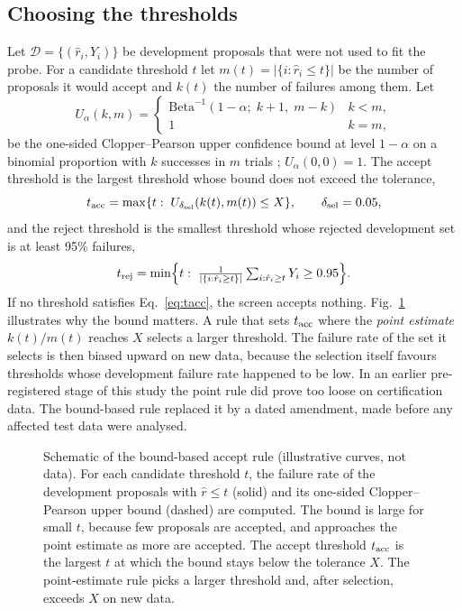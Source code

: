 \subsection{Choosing the thresholds}
Let $\mathcal D=\{(\hat r_i,Y_i)\}$ be development proposals that were not used to fit the probe. For a
candidate threshold $t$ let $m(t)=|\{i:\hat r_i\le t\}|$ be the number of proposals it would accept and $k(t)$ the
number of failures among them. Let
\begin{equation}\label{eq:cp}
U_{\alpha}(k,m)=\begin{cases}\mathrm{Beta}^{-1}(1-\alpha;\;k+1,\;m-k) & k<m,\\ 1 & k=m,\end{cases}
\end{equation}
be the one-sided Clopper--Pearson upper confidence bound at level $1-\alpha$ on a binomial proportion with $k$
successes in $m$ trials \citep{clopper1934}; $U_\alpha(0,0)=1$. The accept threshold is the largest threshold
whose bound does not exceed the tolerance,
\begin{equation}\label{eq:tacc}
t_{\mathrm{acc}}=\max\{t:\;U_{\delta_{\mathrm{sel}}}(k(t),m(t))\le X\},\qquad \delta_{\mathrm{sel}}=0.05,
\end{equation}
and the reject threshold is the smallest threshold whose rejected development set is at least 95\% failures,
\begin{equation}\label{eq:trej}
t_{\mathrm{rej}}=\min\Bigl\{t:\;\tfrac{1}{|\{i:\hat r_i\ge t\}|}\textstyle\sum_{i:\hat r_i\ge t}Y_i\ge 0.95\Bigr\}.
\end{equation}
If no threshold satisfies Eq.~\eqref{eq:tacc}, the screen accepts nothing. Fig.~\ref{fig:threshold} illustrates
why the bound matters. A rule that sets $t_{\mathrm{acc}}$ where the \emph{point estimate} $k(t)/m(t)$ reaches $X$ selects a
larger threshold. The failure rate of the set it selects is then biased upward on new data, because the selection
itself favours thresholds whose development failure rate happened to be low. In an earlier pre-registered stage
of this study the point rule did prove too loose on certification data. The bound-based rule replaced it by a
dated amendment, made before any affected test data were analysed.

\begin{figure}[!htbp]
\centering

\caption{Schematic of the bound-based accept rule (illustrative curves, not data). For each candidate threshold
$t$, the failure rate of the development proposals with $\hat r\le t$ (solid) and its one-sided Clopper--Pearson
upper bound (dashed) are computed. The bound is large for small $t$, because few proposals are accepted, and
approaches the point estimate as more are accepted. The accept threshold $t_{\mathrm{acc}}$ is the largest $t$ at which the
bound stays below the tolerance $X$. The point-estimate rule picks a larger threshold and, after selection,
exceeds $X$ on new data.}
\label{fig:threshold}
\end{figure}

